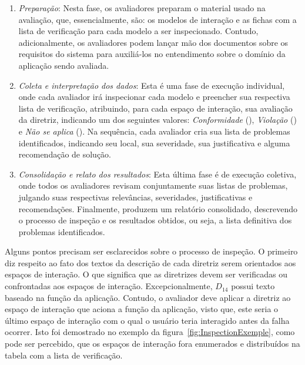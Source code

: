 \begin{enumerate}

  \item  {\em  Preparação}:  Nesta  fase, os  avaliadores  preparam  o
    material usado na avaliação,  que, essencialmente, são: os modelos
    de  interação e as  fichas com  a lista  de verificação  para cada
    modelo   a   ser   inspecionado.   Contudo,   adicionalmente,   os
    avaliadores podem lançar mão dos documentos sobre os requisitos do
    sistema  para  auxiliá-los  no  entendimento sobre  o  domínio  da
    aplicação sendo avaliada.

  \item {\em  Coleta e  interpretação dos dados}:  Esta é uma  fase de
    execução  individual,  onde cada  avaliador  irá inspecionar  cada
    modelo   e  preencher   sua  respectiva   lista   de  verificação,
    atribuindo,  para  cada  espaço  de interação,  sua  avaliação  da
    diretriz, indicando  um dos seguintes  valores: {\em Conformidade}
    (\cf),  {\em Violação}  (\vi) e  {\em  Não se  aplica} (\na).   Na
    sequência,   cada   avaliador   cria   sua  lista   de   problemas
    identificados,   indicando   seu   local,  sua   severidade,   sua
    justificativa e alguma recomendação de solução.

  \item {\em Consolidação e relato dos resultados}: Esta última fase é
    de   execução  coletiva,   onde  todos   os   avaliadores  revisam
    conjuntamente suas listas  de problemas, julgando suas respectivas
    relevâncias,   severidades,    justificativas   e   recomendações.
    Finalmente,  produzem  um  relatório  consolidado,  descrevendo  o
    processo de  inspeção e  os resultados obtidos,  ou seja,  a lista
    definitiva dos problemas identificados.

\end{enumerate}

Alguns pontos precisam ser  esclarecidos sobre o processo de inspeção.
O  primeiro diz  respeito  ao fato  dos  textos da  descrição de  cada
diretriz serem  orientados aos espaços de interação.   O que significa
que as diretrizes devem ser verificadas ou confrontadas aos espaços de
interação.  Excepcionalmente, $D_{14}$  possui texto baseado na função
da aplicação.  Contudo, o avaliador  deve aplicar a diretriz ao espaço
de interação que aciona a função da aplicação, visto que, este seria o
último espaço de interação com o qual o usuário teria interagido antes
da   falha    ocorrer.    Isto   foi   demostrado    no   exemplo   da
figura~\ref{fig:InspectionExemple},  como pode  ser percebido,  que os
espaços de  interação fora enumerados  e distribuídos na tabela  com a
lista de verificação.


